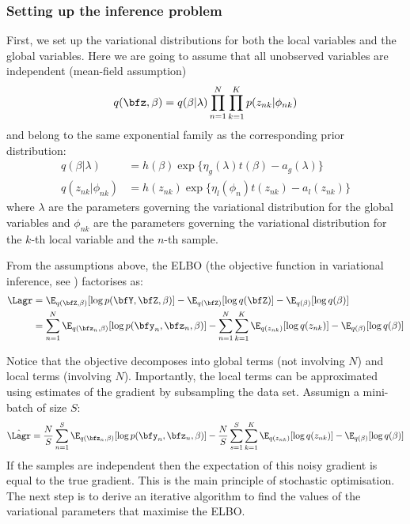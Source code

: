 \subsubsection{Setting up the inference problem}

 First, we set up the variational distributions for both the local variables and the global variables. Here we are going to assume that all unobserved variables are independent (mean-field assumption)
\[
	q(\bfz,\beta) = q(\beta|\lambda) \prod_{n=1}^{N} \prod_{k=1}^{K} p(z_{nk}|\phi_{nk})
\]
and belong to the same exponential family as the corresponding prior distribution:
\begin{align} \label{eq_variational_distributions}
	q(\beta|\lambda) &= h(\beta) \exp\{ \eta_g(\lambda) t(\beta) - a_g(\lambda) \} \\
	q(z_{nk}|\phi_{nk}) &= h(z_{nk}) \exp \{ \eta_l(\phi_{n}) t(z_{nk}) - a_l(z_{nk}) \}
\end{align}
where $\lambda$ are the parameters governing the variational distribution for the global variables and $\phi_{nk}$ are the parameters governing the variational distribution for the $k$-th local variable and the $n$-th sample.

From the assumptions above, the ELBO (the objective function in variational inference, see ) factorises as:
\begin{align} \label{eq_elbo_factorised} \begin{split}
	\Lagr &= \E_{q(\bfZ,\beta)}[\log p(\bfY,\bfZ,\beta)] - \E_{q(\bfZ)}[\log q(\bfZ)] - \E_{q(\beta)}[\log q(\beta)] \\
	 &= \sum_{n=1}^{N} \E_{q(\bfz_n,\beta)}[\log p(\bfy_n,\bfz_n,\beta)] - \sum_{n=1}^{N} \sum_{k=1}^{K} \E_{q(z_{nk})}[\log q(z_{nk})] - \E_{q(\beta)}[\log q(\beta)]
\end{split} \end{align}

Notice that the objective decomposes into global terms (not involving $N$) and local terms (involving $N$). Importantly, the local terms can be approximated using estimates of the gradient by subsampling the data set. Assumign a mini-batch of size $S$:
\[
	\hat{\Lagr} = \frac{N}{S} \sum_{n=1}^{S} \E_{q(\bfz_n,\beta)}[\log p(\bfy_n,\bfz_n,\beta)] - \frac{N}{S}\sum_{s=1}^{S} \sum_{k=1}^{K} \E_{q(z_{nk})}[\log q(z_{nk})] - \E_{q(\beta)}[\log q(\beta)]
\]
If the samples are independent then the expectation of this noisy gradient is equal to the true gradient. This is the main principle of stochastic optimisation. The next step is to derive an iterative algorithm to find the values of the variational parameters that maximise the ELBO.


